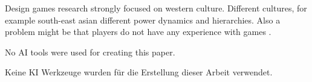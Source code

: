 \documentclass[draft,twoside]{vutinfth}
\begin{document}
    Design games research strongly focused on western culture. Different cultures, for example 
    south-east asian different power dynamics and hierarchies. Also a problem might be that 
    players do not have any experience with games \cite{zhangAddressingCulturalInertias2024}. 

\backmatter

\begin{aitools}
No AI tools were used for creating this paper.
\end{aitools}

\begin{kitools}
Keine KI Werkzeuge wurden für die Erstellung dieser Arbeit verwendet.
\end{kitools}

\listoffigures %

\cleardoublepage %
\listoftables %

\listofalgorithms
{}

\printindex %

\printglossaries %



\end{document}
